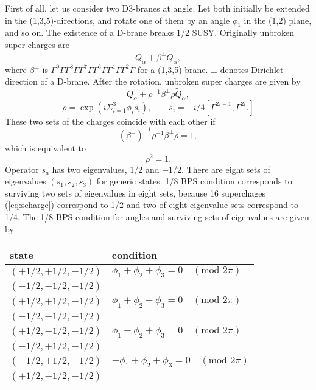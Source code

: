 \documentclass[a4paper,12pt]{article}
\begin{document}
First of all, let us consider two D3-branes at angle. Let both initially be extended in the (1,3,5)-directions, and rotate one of them by an angle $\phi_1$ in the (1,2) plane, and so on. The existence of a D-brane breaks 1/2 SUSY. Originally unbroken super charges are
\begin{equation}
Q_\alpha + \beta^\bot \tilde{Q}_\alpha, \label{eq:scharge}
\end{equation}
where $\beta^\bot$ is $\Gamma^9\Gamma\Gamma^8\Gamma\Gamma^7\Gamma\Gamma^6\Gamma\Gamma^4\Gamma\Gamma^2\Gamma$ for a (1,3,5)-brane. $\bot$ denotes Dirichlet direction of a D-brane. After the rotation, unbroken super charges are given by
\[Q_\alpha + \rho^{-1} \beta^\bot \rho \tilde{Q}_\alpha, \]
\[\rho = \exp(i\Sigma_{i=1}^3 \phi_i s_i ), \qquad  s_i=-i/4[\Gamma^{2i-1},\Gamma^{2i}.] \] 
These two sets of the charges coincide with each other if
\[ (\beta^\bot)^{-1} \rho^{-1} \beta^\bot \rho = 1, \] 
which is equivalent to  
\[\rho^2 = 1.\]
Operator $s_a$ has two eigenvalues, 1/2 and $-$1/2. There are eight sets of eigenvalues $(s_1,s_2,s_3)$ for generic states. 1/8 BPS condition corresponds to surviving two sets of eigenvalues in eight sets, because 16 superchages (\ref{eq:scharge}) correspond to 1/2 and two of eight eigenvalue sets correspond to 1/4. The 1/8 BPS condition for angles and surviving sets of eigenvalues are given by

\hspace{30mm}

\begin{tabular}{l|l}

state & condition \\
\hline
$(+1/2,+1/2,+1/2)$ & $\phi_1 + \phi_2 + \phi_3 = 0 \quad (\mbox{mod 2} \pi)$ \\$(-1/2,-1/2,-1/2)$ &  \\
\hline
$(+1/2,+1/2,-1/2)$ & $\phi_1 + \phi_2 - \phi_3 = 0 \quad (\mbox{mod 2} \pi)$  \\
$(-1/2,-1/2,+1/2)$ & \\
\hline
$(+1/2,-1/2,+1/2)$ & $\phi_1 - \phi_2 + \phi_3 = 0 \quad (\mbox{mod 2} \pi)$ \\
$(-1/2,+1/2,-1/2)$ & \\
\hline
$(-1/2,+1/2,+1/2)$ & $-\phi_1 + \phi_2 + \phi_3 = 0 \quad (\mbox{mod 2} \pi)$ \\
$(+1/2,-1/2,-1/2)$ & \\
 
\end{tabular}

\hspace{30mm}
\end{document}
